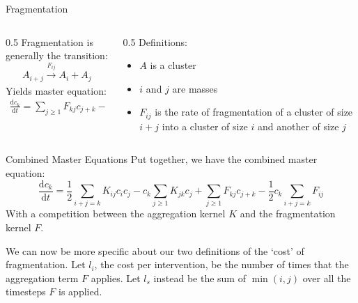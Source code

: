 \documentclass{beamer}
\begin{document}
\begin{frame}{Fragmentation}
    \begin{columns}
        \begin{column}{0.5\textwidth}
            Fragmentation is generally the transition:
            $$
                A_{i+j}  \xrightarrow[]{F_{ij}} A_{i} + A_{j}
            $$
            Yields master equation:
            \begin{align*}
                \frac{\mathrm{d} c_{k}}{\mathrm{d} t } = \sum _{j \geq  1} F_{kj}c_{j+k} - \frac{1}{2} \sum _{i+j=k}F_{ij}
            \end{align*}
        \end{column}
        \begin{column}{0.5\textwidth}
            Definitions:
            \begin{itemize}
                \item $A$ is a cluster
                \item $i$ and $j$ are masses
                \item $F_{ij}$ is the rate of fragmentation of a cluster of size $i+j$ into a cluster of size $i$ and another of size $j$
            \end{itemize}
        \end{column}
    \end{columns}
\end{frame}


\begin{frame}{Combined Master Equations}
    Put together, we have the combined master equation:
    $$
        \frac{\mathrm{d} c_{k}}{\mathrm{d} t }  = \frac{1}{2} \sum _{i+j=k} K_{ij}c_{i}c_{j} - c_{k}\sum _{j \geq  1}K_{jk}c_{j} + \sum _{j\geq  1} F_{kj} c_{j+k} - \frac{1}{2} c_{k} \sum _{i+j=k}F_{ij}
    $$
    With a competition between the aggregation kernel $ K $  and the fragmentation kernel $ F $.

    We can now be more specific about our two definitions of the `cost' of fragmentation. Let $ l_i $, the cost per intervention, be the number of times that the aggregation term $ F $  applies. Let $ l_s $ instead be the sum of $ \min(i, j) $ over all the timesteps $ F $ is applied.
\end{frame}
\end{document}
